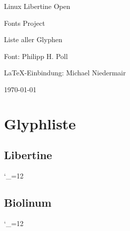 \documentclass{fontdokuold}
\begin{document}
\thispagestyle{empty}

\begin{minipage}{\linewidth}\fontsize{36pt}{40pt}\FontLibertine
   \textcolor{red}{}\quad%
   \fontsize{36pt}{40pt}\FontLibertine%
    Linux Libertine Open\par
   \hfill\fontsize{36pt}{40pt}\FontLibertine%
   Fonts Project\quad%
   \fontsize{36pt}{40pt}\FontLibertine%
   \textcolor{red}{}\par
   \centering%
\end{minipage}

\vfill
\begin{center}
   \fontsize{46pt}{46pt}\FontLibertine%
   Liste aller Glyphen
\end{center}

\vfill
\begin{center}\fontsize{20pt}{18pt}\FontLibertine
Font: Philipp H. Poll\par \LaTeX-Einbindung: Michael Niedermair
\end{center}

\vfill
\begin{center}
{\fontsize{6cm}{6cm}\FontLibertine%
}%
\hfill\fontsize{20pt}{18pt}\FontLibertine\today
\end{center}
\newpage

\chapter{Glyphliste}

\newcommand{\glyphTabEntry}[2]{%
\ifGylphExists{#1}{#2}{%
{\large\texttt{#2}\hfill\Huge\strut\useTextGlyph{#1}{#2}\par}}{}
}

\section{Libertine}
\setlength{\columnsep}{1cm}
\begin{multicols}{2}
{\catcode`\_=12

}
\end{multicols}

\newpage
\section{Biolinum}
\setlength{\columnsep}{1cm}
\begin{multicols}{2}
{\catcode`\_=12

}
\end{multicols}


\end{document}
